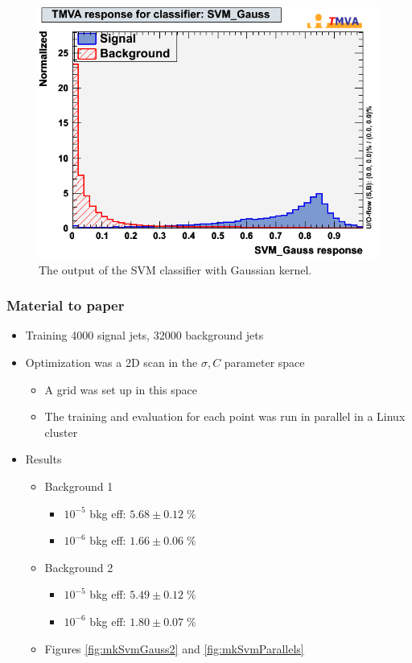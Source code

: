 \begin{figure}[h]
  \begin{center}
    \includegraphics[width=.3\textwidth]{images/mk_svm_gauss}
  \end{center}
  \caption{The output of the SVM classifier with Gaussian kernel.}
  \label{fig:mkSvmGauss}
\end{figure}

\subsubsection{Material to paper}

\begin{itemize}
\item Training 4000 signal jets, 32000 background jets
\item Optimization was a 2D scan in the $\sigma, C$ parameter space
  \begin{itemize}
  \item A grid was set up in this space
  \item The training and evaluation for each point was run in parallel in a Linux cluster
  \end{itemize}
\item Results
  \begin{itemize}
  \item Background 1
    \begin{itemize}
    \item $10^{-5}$ bkg eff: $5.68\pm 0.12\;\%$
    \item $10^{-6}$ bkg eff: $1.66\pm 0.06\;\%$
    \end{itemize}
  \item Background 2
    \begin{itemize}
    \item $10^{-5}$ bkg eff: $5.49\pm 0.12\;\%$
    \item $10^{-6}$ bkg eff: $1.80\pm 0.07\;\%$
    \end{itemize}
  \item Figures \ref{fig:mkSvmGauss2} and \ref{fig:mkSvmParallels}
  \end{itemize}
\end{itemize}

